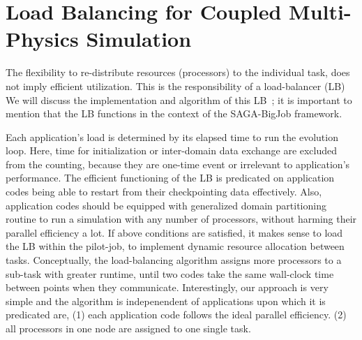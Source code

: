 \documentclass[conference,final]{IEEEtran}
\newcommand{\jhanote}[1]{ {\textcolor{red} { ***Jha: #1 }}}
\newcommand{\jhanote}[1]{}
\begin{document}
\section{Load Balancing for Coupled Multi-Physics Simulation}





The flexibility to re-distribute resources (processors) to the
individual task, does not imply efficient utilization. This is the
responsibility of a load-balancer (LB) We will discuss the
implementation and algorithm of this LB~\cite{Ko}; it is important to mention
that the LB functions in the context of the SAGA-BigJob framework.

Each application's load is determined by its elapsed time to run the
evolution loop. Here, time for initialization or inter-domain data
exchange are excluded from the counting, because they are one-time
event or irrelevant to application's performance.  The efficient
functioning of the LB is predicated on application codes being able to
restart from their checkpointing data effectively.  Also, application codes should be equipped with generalized domain partitioning routine to run
a simulation with any number of processors, without harming their
parallel efficiency a lot. If above conditions are satisfied, it makes
sense to load the LB within the pilot-job, to implement dynamic
resource allocation between tasks.  Conceptually, the load-balancing
algorithm assigns more processors to a sub-task with greater runtime,
until two codes take the same wall-clock time between points when they
communicate. Interestingly, our approach is very simple and the
algorithm is indepenendent of applications upon which it is predicated
are, (1) each application code follows the ideal parallel efficiency.
(2) all processors in one node are assigned to one single task.
\end{document}
